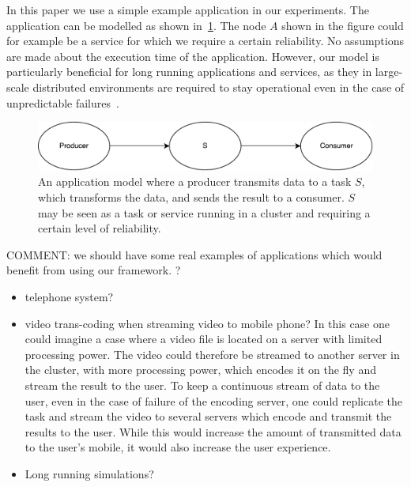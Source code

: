 \documentclass{cslthse-msc}
\begin{document}
In this paper we use a simple example application in our experiments. The application can be modelled as shown in~\cref{fig:app_model}. The node $A$ shown in the figure could for example be a service for which we require a certain reliability. No assumptions are made about the execution time of the application. However, our model is particularly beneficial for long running applications and services, as they in large-scale distributed environments are required to stay operational even in the case of unpredictable failures~\cite{imprRelAdaptRL}.


\begin{figure}[!hbt]
\centering
\includegraphics[scale=0.5]{images/app_model.pdf} 
\caption{An application model where a producer transmits data to a task $S$, which transforms the data, and sends the result to a consumer. $S$ may be seen as a task or service running in a cluster and requiring a certain level of reliability.}\label{fig:app_model}
\end{figure}

COMMENT: we should have some real examples of applications which would benefit from using our framework. ?
\begin{itemize}
\item telephone system?
\item video trans-coding when streaming video to mobile phone? In this case one could imagine a case where a video file is located on a server with limited processing power. The video could therefore be streamed to another server in the cluster, with more processing power, which encodes it on the fly and stream the result to the user. To keep a continuous stream of data to the user, even in the case of failure of the encoding server, one could replicate the task and stream the video to several servers which encode and transmit the results to the user. While this would increase the amount of transmitted data to the user's mobile, it would also increase the user experience.
\item Long running simulations? \cite{relModelDistSimSystem}
\end{itemize}
\end{document}
